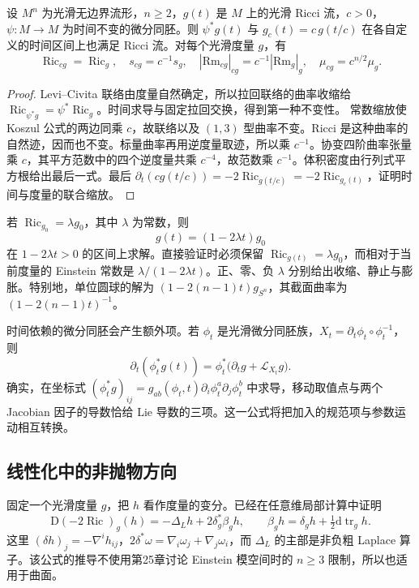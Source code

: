 \begin{proposition}\label{g3:prop:ricci-flow-invariance}
	设 \(M^n\) 为光滑无边界流形，\(n\ge2\)，\(g(t)\) 是 \(M\) 上的光滑 Ricci 流，\(c>0\)，\(\psi:M\to M\) 为时间不变的微分同胚。则 \(\psi^*g(t)\) 与 \(g_c(t)=c\,g(t/c)\) 在各自定义的时间区间上也满足 Ricci 流。对每个光滑度量 \(g\)，有
	\begin{equation}\label{g3:eq:ricci-flow-scaling}
		\operatorname{Ric}_{cg}=\operatorname{Ric}_g,\quad
		s_{cg}=c^{-1}s_g,\quad
		|\mathrm{Rm}_{cg}|_{cg}=c^{-1}|\mathrm{Rm}_g|_g,\quad
		\mu_{cg}=c^{n/2}\mu_g.
	\end{equation}
\end{proposition}
\begin{proof}
	Levi--Civita 联络由度量自然确定，所以拉回联络的曲率收缩给 \(\operatorname{Ric}_{\psi^*g}=\psi^*\operatorname{Ric}_g\)。时间求导与固定拉回交换，得到第一种不变性。
	常数缩放使 Koszul 公式的两边同乘 \(c\)，故联络以及 \((1,3)\) 型曲率不变。Ricci 是这种曲率的自然迹，因而也不变。标量曲率再用逆度量取迹，所以乘 \(c^{-1}\)。协变四阶曲率张量乘 \(c\)，其平方范数中的四个逆度量共乘 \(c^{-4}\)，故范数乘 \(c^{-1}\)。体积密度由行列式平方根给出最后一式。最后
	\(\partial_t(cg(t/c))=-2\operatorname{Ric}_{g(t/c)}=-2\operatorname{Ric}_{g_c(t)}\)，证明时间与度量的联合缩放。
\end{proof}

\begin{example}\label{g3:exm:ricci-flow-einstein-scaling}
	若 \(\operatorname{Ric}_{g_0}=\lambda g_0\)，其中 \(\lambda\) 为常数，则
	\[
		g(t)=(1-2\lambda t)g_0
	\]
	在 \(1-2\lambda t>0\) 的区间上求解。直接验证时必须保留 \(\operatorname{Ric}_{g(t)}=\lambda g_0\)，而相对于当前度量的 Einstein 常数是 \(\lambda/(1-2\lambda t)\)。正、零、负 \(\lambda\) 分别给出收缩、静止与膨胀。特别地，单位圆球的解为 \((1-2(n-1)t)g_{S^n}\)，其截面曲率为 \((1-2(n-1)t)^{-1}\)。
\end{example}

时间依赖的微分同胚会产生额外项。若 \(\phi_t\) 是光滑微分同胚族，\(X_t=\partial_t\phi_t\circ\phi_t^{-1}\)，则
\begin{equation}\label{g3:eq:ricci-flow-time-pullback}
	\partial_t(\phi_t^*g(t))
	=\phi_t^*\bigl(\partial_tg+\mathcal L_{X_t}g\bigr).
\end{equation}
确实，在坐标式 \((\phi_t^*g)_{ij}=g_{ab}(\phi_t,t)\partial_i\phi_t^a\partial_j\phi_t^b\) 中求导，移动取值点与两个 Jacobian 因子的导数恰给 Lie 导数的三项。这一公式将把加入的规范项与参数运动相互转换。

\subsection{线性化中的非抛物方向}
\label{g3:subsec:2701:02}
固定一个光滑度量 \(g\)，把 \(h\) 看作度量的变分。已经在任意维局部计算中证明
\[
	\mathrm D(-2\operatorname{Ric})_g(h)
	=-\Delta_Lh+2\delta_g^*\beta_gh,
	\qquad \beta_gh=\delta_gh+\tfrac12\mathrm d\operatorname{tr}_gh.
\]
这里 \((\delta h)_j=-\nabla^ih_{ij}\)，\(2\delta^*\omega=\nabla_i\omega_j+\nabla_j\omega_i\)，而 \(\Delta_L\) 的主部是非负粗 Laplace 算子。该公式的推导不使用第25章讨论 Einstein 模空间时的 \(n\ge3\) 限制，所以也适用于曲面。

